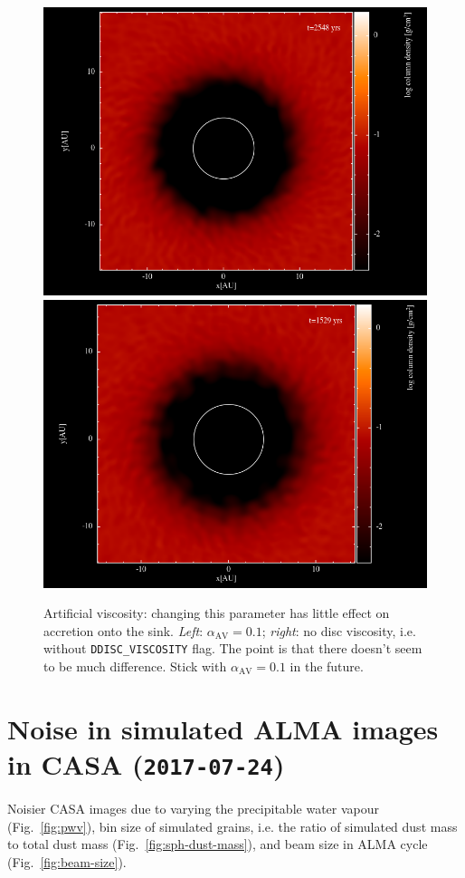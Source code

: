 \documentclass[usenatbib,a4paper,times,fleqn]{mnras}
\begin{document}
\begin{figure}
   \begin{center}
      \includegraphics[width=0.48\columnwidth]{figs/artificial-viscosity-1e-1.png}
      \includegraphics[width=0.48\columnwidth]{figs/artificial-viscosity-noDDISC_VISCOSITY.png}
      \caption{Artificial viscosity: changing this parameter has little effect
         on accretion onto the sink. \textit{Left}: $\alpha_{\mathrm{AV}}=0.1$;
         \textit{right}: no disc viscosity, i.e. without
         \texttt{DDISC\_VISCOSITY} flag. The point is that there doesn't seem to
         be much difference. Stick with $\alpha_{\mathrm{AV}}=0.1$ in the
      future.}
      \label{fig:artificial-viscosity}
   \end{center}
\end{figure}


\section*{Noise in simulated ALMA images in CASA (\texttt{2017-07-24})}

Noisier CASA images due to varying the precipitable water vapour
(Fig.~\ref{fig:pwv}), bin size of simulated grains, i.e. the ratio of simulated
dust mass to total dust mass (Fig.~\ref{fig:sph-dust-mass}), and beam size in
ALMA cycle (Fig.~\ref{fig:beam-size}).
\end{document}
